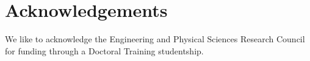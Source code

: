 \documentclass[journal]{IEEEtran}
\begin{document}



 



\section*{Acknowledgements}
We like to acknowledge the Engineering and Physical Sciences Research Council for funding through a Doctoral Training studentship.




\end{document}
